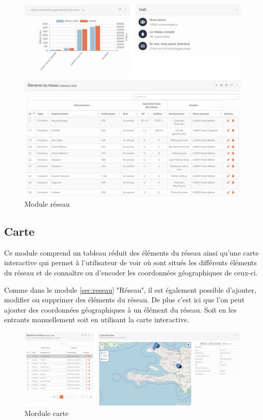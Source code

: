 \documentclass{EPL-master-thesis-covers-FR}
\begin{document}
				\begin{figure}[H]
					\centering
					\includegraphics[width=1\textwidth]{images/water_elem}
					\caption{Module réseau}
				\end{figure}
				
\newpage
				
			\subsection{Carte}
				Ce module comprend un tableau réduit des éléments du réseau ainsi qu'une carte interactive qui permet à l'utilisateur de voir où sont situés les différents éléments du réseau et de connaître ou d'encoder les coordonnées géographiques de ceux-ci. 
				
				Comme dans le module \ref{sec:reseau} "Réseau", il est également possible d'ajouter, modifier ou supprimer des éléments du réseau. De plus c'est ici que l'on peut ajouter des coordonnées géographiques à un élément du réseau. Soit en les entrants manuellement soit en utilisant la carte interactive.
				\begin{figure}[H]
					\centering
					\includegraphics[width=1\textwidth]{images/map}
					\caption{Mordule carte}
				\end{figure}
				
\end{document}
